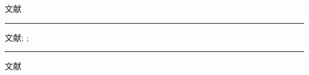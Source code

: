 \documentclass{article}
\begin{document}

\noindent\parbox{15cm}{
\begin{refsection}
文献\cite{Yi2013--}
\parencite{WHO1970--}
\cite{FOURNEY1971-17-38}

\vspace{-0.5cm}
\printbibliography[heading=subbibliography,title={节一：用顺序编码制}]
\end{refsection}
}

\noindent\rule{1.05\linewidth}{0.4pt}

\noindent\parbox{15cm}{
\begin{refsection}
文献\cite{FOURNEY1971-17-38};
\parencite{abx2007-500-503};
\textcite{张伯伟2002--}

\vspace{-0.5cm}
\printbibliography[heading=subbibliography,title={节二：用著者年份制}]%
\end{refsection}
}

\noindent\rule{1.05\linewidth}{0.4pt}

\noindent\parbox{15cm}{
\begin{refsection}
文献\cite{Yi2013--}
\parencite{abx2007-500-503}
\cite{张伯伟2002--}

\vspace{-0.5cm}
\printbibliography[heading=subbibliography,title={节三：用顺序编码制}]
\end{refsection}
}
\end{document}

